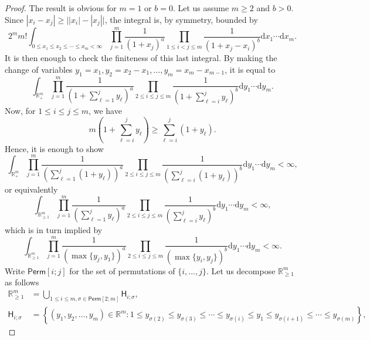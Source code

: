 \documentclass[]{article}
\begin{document}
\begin{proof}
The result is obvious for $m=1$ or $b=0$. Let us assume $m\ge 2$ and $b>0$. Since $|x_i - x_j| \geq \big||x_i| - |x_j| \big|$, the integral is, by symmetry, bounded by 
\begin{equation*}
2^m m! \int_{0\le x_1\le x_2\le\cdots\le x_m<\infty}\prod_{j=1}^m\frac{1}{(1+x_j)^a}\prod_{1\le i<j \le m}\frac{1}{(1+x_j-x_i)^b}\mathrm{d}x_1\cdots \mathrm{d}x_m.
\end{equation*}
It is then enough to check the finiteness of this last integral. 
By making the change of variables $y_1=x_1, y_2=x_2-x_1, \dots, y_m=x_m-x_{m-1}$, it is equal to
\begin{equation*}
\int_{\mathbb{R}_+^m} \prod_{j=1}^m \frac{1}{\left(1+\sum_{\ell=1}^jy_\ell\right)^a} \prod_{2\le i\le j\le m}\frac{1}{\left(1+\sum_{\ell=i}^j y_\ell\right)^b}\mathrm{d}y_1\cdots \mathrm{d}y_m.
\end{equation*}
Now, for $1\le i \le j \le m$, we have
$$ m \left(1+\sum_{\ell=i}^j y_{\ell} \right) \geq  \sum_{\ell = i}^j (1 + y_{\ell}).$$
Hence, it is enough to show
\begin{equation*}
 \int_{\mathbb{R}^{m}_+}\prod_{j=1}^m \frac{1}{\left(\sum_{\ell=1}^j (1 + y_\ell)\right)^a} \prod_{2\le i\le j\le m}\frac{1}{\left(\sum_{\ell=i}^j (1 + y_\ell) \right)^b}\mathrm{d}y_1\cdots \mathrm{d}y_m<\infty,
\end{equation*}
 or equivalently 
\begin{equation*}
 \int_{\mathbb{R}^{m}_{\ge 1}}\prod_{j=1}^m \frac{1}{\left(\sum_{\ell=1}^jy_\ell\right)^a} \prod_{2\le i\le j\le m}\frac{1}{\left(\sum_{\ell=i}^j y_\ell\right)^b}\mathrm{d}y_1\cdots \mathrm{d}y_m<\infty,
\end{equation*}
which is in turn implied by
\begin{equation*}
\int_{\mathbb{R}^{m}_{\ge 1}}\prod_{j=1}^m \frac{1}{\left(\max\{y_j,y_1\}\right)^a} \prod_{2\le i\le j\le m}\frac{1}{\left(\max\{y_i,y_j\}\right)^b}\mathrm{d}y_1\cdots \mathrm{d}y_m<\infty.
\end{equation*}
Write $\mathsf{Perm}[i;j]$ for the set of permutations of $\{i,\dots,j\}$.
Let us decompose $\mathbb{R}_{\ge 1}^m$ as follows
\begin{align*}
\mathbb{R}_{\ge 1}^m &=\bigcup_{1\le i \le m,  \sigma \in \mathsf{Perm}[2;m]}\mathsf{H}_{i;\sigma}, \\ \mathsf{H}_{i;\sigma}&=\left\{(y_1,y_2,\dots,y_m)\in \mathbb{R}^m:1\le y_{\sigma(2)}\le y_{\sigma(3)}\le \cdots \le y_{\sigma(i)} \le y_1  \le y_{\sigma(i+1)}\le \cdots \le y_{\sigma(m)}\right\},

\end{align*}
\end{proof}
\end{document}
